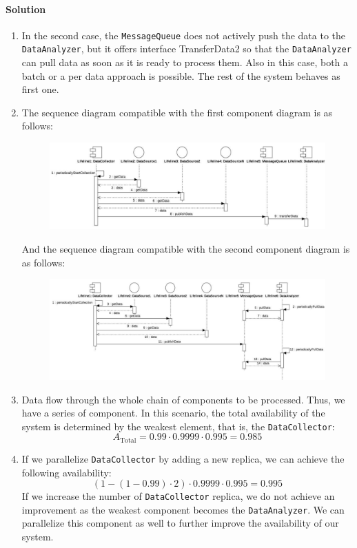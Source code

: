 \paragraph*{Solution}
\begin{enumerate}
    \item In the second case, the \texttt{MessageQueue} does not actively push the data to the \texttt{DataAnalyzer}, but it offers interface TransferData2 so that the \texttt{DataAnalyzer} can pull data as soon as it is ready to process them. 
        Also in this case, both a batch or a per data approach is possible. 
        The rest of the system behaves as first one.
    \item The sequence diagram compatible with the first component diagram is as follows: 
        \begin{figure}[H]
            \centering
            \includegraphics[width=0.9\linewidth]{images/sd3.png}
        \end{figure}
        And the sequence diagram compatible with the second component diagram is as follows: 
        \begin{figure}[H]
            \centering
            \includegraphics[width=0.9\linewidth]{images/sd4.png}
        \end{figure}
    \item Data flow through the whole chain of components to be processed. 
        Thus, we have a series of component.
        In this scenario, the total availability of the system is determined by the weakest element, that is, the \texttt{DataCollector}: 
        \[A_{\text{Total}} = 0.99 \cdot 0.9999 \cdot 0.995 = 0.985\]
    \item  If we parallelize \texttt{DataCollector} by adding a new replica, we can achieve the following availability:
    \[(1-(1-0.99)\cdot 2) \cdot 0.9999 \cdot 0.995 = 0.995\]
    If we increase the number of \texttt{DataCollector} replica, we do not achieve an improvement as the weakest component becomes the \texttt{DataAnalyzer}.
    We can parallelize this component as well to further improve the availability of our system.
\end{enumerate}